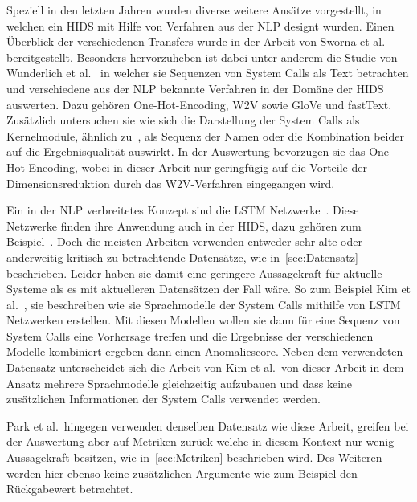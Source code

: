         Speziell in den letzten Jahren wurden diverse weitere Ansätze vorgestellt, in welchen ein \ac{HIDS} mit Hilfe von Verfahren aus der \ac{NLP} designt wurden.
        Einen Überblick der verschiedenen Transfers wurde in der Arbeit von Sworna et al.~\cite{NLPHIDSSWORNA2022} bereitgestellt.
        Besonders hervorzuheben ist dabei unter anderem die Studie von Wunderlich et al.~\cite{W2VWUNDERLICH2019} in welcher sie Sequenzen von System Calls als Text betrachten und verschiedene aus der \ac{NLP} bekannte Verfahren in der Domäne der \ac{HIDS} auswerten.
        Dazu gehören One-Hot-Encoding, \ac{W2V} sowie GloVe und fastText. 
        Zusätzlich untersuchen sie wie sich die Darstellung der System Calls als Kernelmodule, ähnlich zu~\cite{SYSTEM_STATES}, als Sequenz der Namen oder die Kombination beider auf die Ergebnisqualität auswirkt.
        In der Auswertung bevorzugen sie das One-Hot-Encoding, wobei in dieser Arbeit nur geringfügig auf die Vorteile der Dimensionsreduktion durch das \ac{W2V}-Verfahren eingegangen wird.

        Ein in der \ac{NLP} verbreitetes Konzept sind die \ac{LSTM} Netzwerke~\cite{LSTMNLP2016,LSTMREVIEWYU2019}.
        Diese Netzwerke finden ihre Anwendung auch in der \ac{HIDS}, dazu gehören zum Beispiel~\cite{LSTMsys, LSTMPARK2021, LSTMSURATKAR2019, NIU2020, BIDIRECTIONALLSTMCHAWLA2019, VARIATIONALLSTMBOUZAR2019}.
        Doch die meisten Arbeiten verwenden entweder sehr alte oder anderweitig kritisch zu betrachtende Datensätze, wie in~\autoref{sec:Datensatz} beschrieben.
        Leider haben sie damit eine geringere Aussagekraft für aktuelle Systeme als es mit aktuelleren Datensätzen der Fall wäre.
        So zum Beispiel Kim et al.~\cite{LSTMsys}, sie beschreiben wie sie Sprachmodelle der System Calls mithilfe von \ac{LSTM} Netzwerken erstellen.
        Mit diesen Modellen wollen sie dann für eine Sequenz von System Calls eine Vorhersage treffen und die Ergebnisse der verschiedenen Modelle kombiniert ergeben dann einen Anomaliescore.
        Neben dem verwendeten Datensatz unterscheidet sich die Arbeit von Kim et al.\ von dieser Arbeit in dem Ansatz mehrere Sprachmodelle gleichzeitig aufzubauen und dass keine zusätzlichen Informationen der System Calls verwendet werden.

        Park et al.\ hingegen verwenden denselben Datensatz wie diese Arbeit, greifen bei der Auswertung aber auf Metriken zurück welche in diesem Kontext nur wenig Aussagekraft besitzen, wie in~\autoref{sec:Metriken} beschrieben wird.
        Des Weiteren werden hier ebenso keine zusätzlichen Argumente wie zum Beispiel den Rückgabewert betrachtet.~\cite{LSTMPARK2021}

